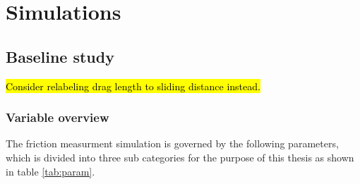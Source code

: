 \newpage
\chapter*{Simulations}




\section{Baseline study}

\hl{Consider relabeling drag length to sliding distance instead.}

\subsection{Variable overview}

The friction measurment simulation is governed by the following parameters, which is divided into three sub categories for the purpose of this thesis as shown in table \ref{tab:param}.




